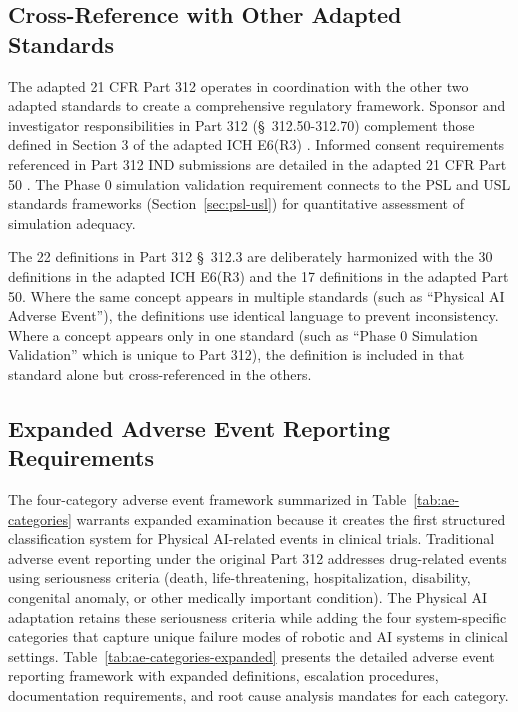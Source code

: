 \subsection{Cross-Reference with Other Adapted Standards}
\label{subsec:cfr312-cross-ref}

The adapted 21 CFR Part 312 operates in coordination with the other two
adapted standards to create a comprehensive regulatory framework. Sponsor and
investigator responsibilities in Part 312 (\S~312.50-312.70) complement those
defined in Section 3 of the adapted ICH E6(R3) \cite{ich-adapt}. Informed
consent requirements referenced in Part 312 IND submissions are detailed in
the adapted 21 CFR Part 50 \cite{cfr50-adapt}. The Phase 0 simulation
validation requirement connects to the PSL and USL standards frameworks
(Section~\ref{sec:psl-usl}) for quantitative assessment of simulation
adequacy.

The 22 definitions in Part 312 \S~312.3 are deliberately harmonized with the
30 definitions in the adapted ICH E6(R3) and the 17 definitions in the adapted
Part 50. Where the same concept appears in multiple standards (such as
``Physical AI Adverse Event''), the definitions use identical language to
prevent inconsistency. Where a concept appears only in one standard (such as
``Phase 0 Simulation Validation'' which is unique to Part 312), the definition
is included in that standard alone but cross-referenced in the others.

\subsection{Expanded Adverse Event Reporting Requirements}
\label{subsec:cfr312-ae-expanded}

The four-category adverse event framework summarized in
Table~\ref{tab:ae-categories} warrants expanded examination because it creates
the first structured classification system for Physical AI-related events in
clinical trials. Traditional adverse event reporting under the original Part
312 addresses drug-related events using seriousness criteria (death,
life-threatening, hospitalization, disability, congenital anomaly, or other
medically important condition). The Physical AI adaptation retains these
seriousness criteria while adding the four system-specific categories that
capture unique failure modes of robotic and AI systems in clinical settings.
Table~\ref{tab:ae-categories-expanded} presents the detailed adverse event
reporting framework with expanded definitions, escalation procedures,
documentation requirements, and root cause analysis mandates for each category.


